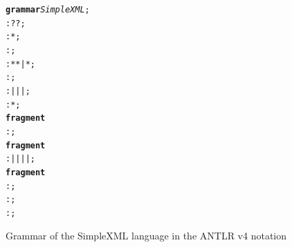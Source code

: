 \begin{figure}[ht]
\centering
\begin{framed}
\begin{alltt}
\textbf{grammar} \textit{SimpleXML};
  : ? ?  ;
    :  *  ;
   : \antlrliteral{<!--}  \antlrliteral{-->} ;
   : \antlrliteral{<}  * \antlrliteral{>} * \antlrliteral{</}  \antlrliteral{>} | \antlrliteral{<}  * \antlrliteral{/>} ;
    :     ;
   :  |  |  |  ;
      :  * ;
\textbf{fragment}
     : \antlrregex{[0-9]} ;
\textbf{fragment}
  :  | \antlrliteral{-} | \antlrliteral{\_} |  |  ;
\textbf{fragment}
 : \antlrregex{[:a-zA-Z]} ;
      : \antlrregex{~[<"]*} ;
     : \antlrliteral{<![CDATA[}  \antlrliteral{]]>} ;
\end{alltt}
\end{framed}
\caption{Grammar of the SimpleXML language in the ANTLR v4 notation}
\label{fig:SIMPLEXML}
\end{figure}

